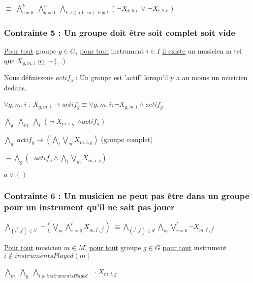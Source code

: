 \documentclass[a4paper,10pt]{report}
\begin{document}
$\equiv$ $\bigwedge \limits_{c=0}^{k}$ $\bigwedge \limits_{b=0}^{n}$  $\bigwedge \limits_{k,l \in (0..m); k\neq l}$ ( $\neg X_{k,b,c}$ $\vee $ $ \neg X_{l,b,c}$ ) 


\subsubsection{Contrainte 5 : Un groupe doit être soit complet soit vide} 
 
\underline{Pour tout} groupe $g \in G$, \underline{pour tout} instrument $i \in I$ \underline{il existe} un musicien m tel que $X_{g,m,i}$  \underline{ou} $\neg$ (...)


Nous définissons $actif_g$ : Un groupe est 'actif' lorsqu'il y a au moins un musicien dedans.

$\forall g,m,i$ . $X_{g,m,i} \rightarrow actif_g \equiv \forall g,m,i : \neg X_{g,m,i} \wedge actif_g$

$\bigwedge \limits_{g}$ $\bigwedge \limits_{m}$ $\bigwedge \limits_{i}$ ( $\neg$ $X_{m,i,g}$ $\wedge actif_g $ )
 
$\bigwedge \limits_{g}$ $actif_g \rightarrow (\bigwedge \limits_{i} \bigvee \limits_{m} X_{m,i,g})$  (groupe complet)

$\equiv \bigwedge \limits_{g} ( \neg actif_g \wedge \bigwedge \limits_{i} \bigvee \limits_{m} X_{m,i,g}) $

$ a \vee () $


\subsubsection{Contrainte 6 : Un musicien ne peut pas être dans un groupe pour un instrument qu'il ne sait pas jouer}


$\bigwedge \limits_{(i^l, j^l) \in \delta^l}$ $ \neg (\bigvee \limits_{m} \bigwedge \limits_{r=0}^{l} X_{m,i^l,j^l}) $
$\equiv \bigwedge \limits_{(i^l, j^l) \in \delta^l} \bigwedge \limits_{m} \bigvee \limits_{r=0}^{l} \neg X_{m,i^l,j^l}$

\underline{Pour tout} musicien $m \in M$, \underline{pour tout} groupe $g \in G$ \underline{pour tout} instrument $i \notin instrumentsPlayed(m)$

$\bigwedge \limits_{m}$ $\bigwedge \limits_{g}$ $\bigwedge \limits_{i \notin instrumentsPlayed}$  $\neg$ $X_{m,i,g}$
 
\end{document}
